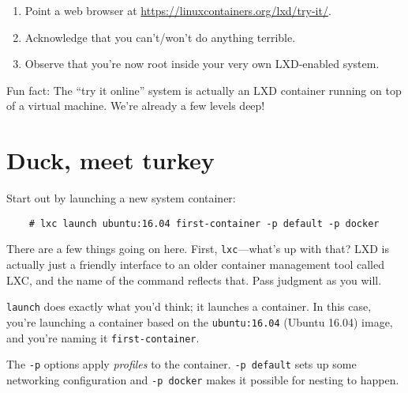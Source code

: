 \begin{enumerate}
  \item Point a web browser at \url{https://linuxcontainers.org/lxd/try-it/}.
  \item Acknowledge that you can't/won't do anything terrible.
  \item Observe that you're now root inside your very own LXD-enabled system.
\end{enumerate}

Fun fact: The ``try it online'' system is actually an LXD container running on top of a virtual machine. We're already a few levels deep!

\section*{Duck, meet turkey}

Start out by launching a new system container:

\begin{verbatim}
    # lxc launch ubuntu:16.04 first-container -p default -p docker
\end{verbatim}

There are a few things going on here. First, \texttt{lxc}---what's up with that? LXD is actually just a friendly interface to an older container management tool called LXC, and the name of the command reflects that. Pass judgment as you will.

\texttt{launch} does exactly what you'd think; it launches a container. In this case, you're launching a container based on the \texttt{ubuntu:16.04} (Ubuntu 16.04) image, and you're naming it \texttt{first-container}.

The \texttt{-p} options apply \textit{profiles} to the container. \texttt{-p default} sets up some networking configuration and \texttt{-p docker} makes it possible for nesting to happen.